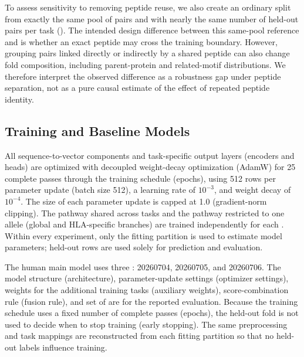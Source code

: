 To assess sensitivity to removing peptide reuse, we also create an ordinary split from exactly the same pool of pairs and with nearly the same number of held-out pairs per task (\plainMatchedOOF{}). The intended design difference between this same-pool reference and \plainPeptideOOF{} is whether an exact peptide may cross the training boundary. However, grouping pairs linked directly or indirectly by a shared peptide can also change fold composition, including parent-protein and related-motif distributions. We therefore interpret the observed difference as a robustness gap under peptide separation, not as a pure causal estimate of the effect of repeated peptide identity.

\subsection{Training and Baseline Models}

All sequence-to-vector components and task-specific output layers (encoders and heads) are optimized with decoupled weight-decay optimization (AdamW) \cite{loshchilov2019adamw} for 25 complete passes through the training schedule (epochs), using 512 rows per parameter update (batch size 512), a learning rate of \(10^{-3}\), and weight decay of \(10^{-4}\). The size of each parameter update is capped at 1.0 (gradient-norm clipping). The pathway shared across tasks and the pathway restricted to one \plainHLA{} allele (global and HLA-specific branches) are trained independently for each \plainSeed{}. Within every \plainOOF{} experiment, only the fitting partition is used to estimate model parameters; held-out rows are used solely for prediction and evaluation.

The human main model uses three \plainSeeds{}: 20260704, 20260705, and 20260706. The model structure (architecture), parameter-update settings (optimizer settings), weights for the additional training tasks (auxiliary weights), score-combination rule (fusion rule), and set of \plainSeeds{} are \plainFrozen{} for the reported evaluation. Because the training schedule uses a fixed number of complete passes (epochs), the held-out fold is not used to decide when to stop training (early stopping). The same preprocessing and task mappings are reconstructed from each fitting partition so that no held-out labels influence training.

